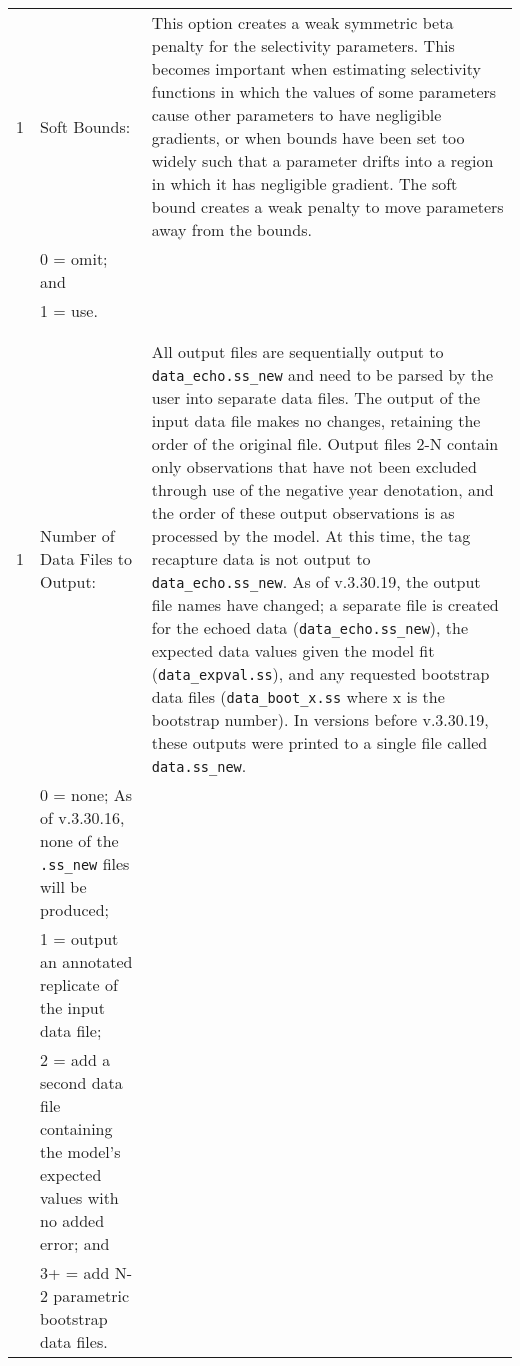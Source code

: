{\begin{landscape}
\begin{longtable}{p{1.5cm} p{7.2cm} p{12.3cm}}
 \hline
 1 & Soft Bounds: & \multirow{1}{1cm}[-0.25cm]{\parbox{12.5cm}{This option creates a weak symmetric beta penalty for the selectivity parameters. This becomes important when estimating selectivity functions in which the values of some parameters cause other parameters to have negligible gradients, or when bounds have been set too widely such that a parameter drifts into a region in which it has negligible gradient. The soft bound creates a weak penalty to move parameters away from the bounds.}}\Tstrut\Bstrut\\
   & 0 = omit; and & \\
   & 1 = use. & \\
   & & \\
   & & \\

 \hline
 1 & Number of Data Files to Output: & \multirow{1}{1cm}[-0.25cm]{\parbox{12.5cm}{All output files are sequentially output to \texttt{data\_echo.ss\_new} and need to be parsed by the user into separate data files. The output of the input data file makes no changes, retaining the order of the original file. Output files 2-N contain only observations that have not been excluded through use of the negative year denotation, and the order of these output observations is as processed by the model. At this time, the tag recapture data is not output to \texttt{data\_echo.ss\_new}. As of v.3.30.19, the output file names have changed; a separate file is created for the echoed data (\texttt{data\_echo.ss\_new}), the expected data values given the model fit (\texttt{data\_expval.ss}), and any requested bootstrap data files (\texttt{data\_boot\_x.ss} where x is the bootstrap number). In versions before v.3.30.19, these outputs were printed to a single file called \texttt{data.ss\_new}.}} \Tstrut\Bstrut\\
   & 0 = none; As of v.3.30.16, none of the \texttt{.ss\_new} files will be produced; & \Bstrut\\
   & 1 = output an annotated replicate of the input data file; & \Tstrut\Bstrut\\
   & 2 = add a second data file containing the model's expected values with no added error; and & \Tstrut\Bstrut\\
   & 3+ = add N-2 parametric bootstrap data files. & \Tstrut\\


\end{longtable}
\end{landscape}}
